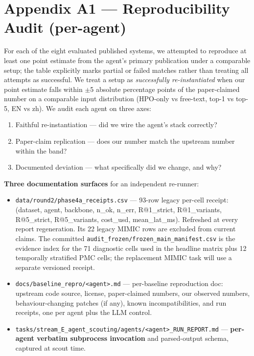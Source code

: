 \section{Appendix A1 --- Reproducibility Audit (per-agent)}\label{appendix-a1-reproducibility-audit-per-agent}

For each of the eight evaluated published systems, we attempted to reproduce
at least one point estimate from the agent's primary publication under a
comparable setup; the table explicitly marks partial or failed matches rather
than treating all attempts as successful. We treat a setup as \emph{successfully
re-instantiated} when our point estimate falls within \ensuremath{\pm}5 absolute
percentage points of the paper-claimed number on a comparable input
distribution (HPO-only vs free-text, top-1 vs top-5, EN vs zh). We
audit each agent on three axes:

\begin{enumerate}
\def\labelenumi{\arabic{enumi}.}
\tightlist
\item
  Faithful re-instantiation --- did we wire the agent's stack
  correctly?
\item
  Paper-claim replication --- does our number match the upstream
  number within the band?
\item
  Documented deviation --- what specifically did we change, and
  why?
\end{enumerate}

\textbf{Three documentation surfaces} for an independent re-runner:

\begin{itemize}
\tightlist
\item
  \texttt{data/round2/phase4a\_receipts.csv} --- 93-row legacy per-cell receipt:
  (dataset, agent, backbone, n\_ok, n\_err, R@1\_strict, R@1\_variants,
  R@5\_strict, R@5\_variants, cost\_usd, mean\_lat\_ms). Refreshed at every
  report regeneration. Its 22 legacy MIMIC rows are excluded from current
  claims. The committed \texttt{audit\_frozen/frozen\_main\_manifest.csv} is the
  evidence index for the 71 diagnostic cells used in the headline matrix plus
  12 temporally stratified PMC cells; the replacement MIMIC task will use a
  separate versioned receipt.
\item
  \texttt{docs/baseline\_repro/\textless{}agent\textgreater{}.md} --- per-baseline reproduction doc: upstream code source, license, paper-claimed numbers, our
  observed numbers, behaviour-changing patches (if any), known
  incompatibilities, and run receipts, one per agent plus the LLM
  control.
\item
  \texttt{tasks/stream\_E\_agent\_scouting/agents/\textless{}agent\textgreater{}\_RUN\_REPORT.md} ---
  \textbf{per-agent verbatim subprocess invocation} and parsed-output
  schema, captured at scout time.
\end{itemize}

